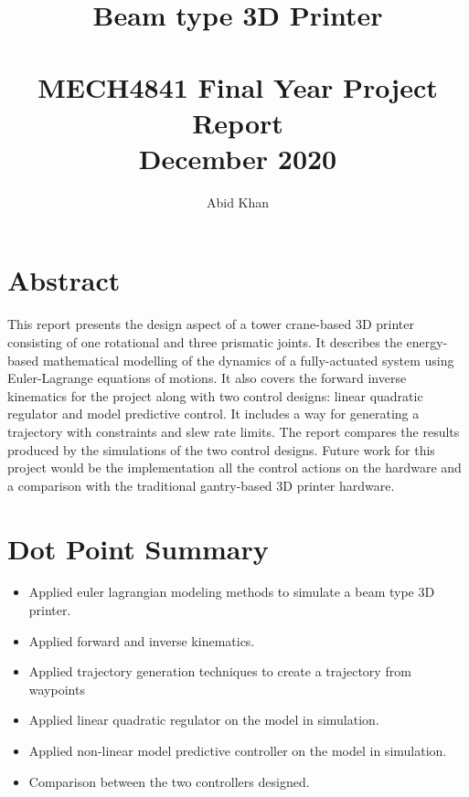 \documentclass{UoNMCHA}
\numberwithin{equation}{section}
\begin{document}
	\title{Beam type 3D Printer \\ \ \\
		{\small MECH4841 Final Year Project Report  \\December 2020}}
	\author[UoNMCHA]{Abid Khan}
	\address[UoNMCHA]{
		Student of Mechatronics Engineering,\\
		The University of Newcastle, Callaghan, NSW 2308, AUSTRALIA \\
		Student Number: 3189548 \\
		E-mail: \href{mailto: c3189548@uon.edu.au}{\textsf{ c3189548@uon.edu.au}}}
	\maketitle
	\onecolumn
	
	\newpage
	\vspace{-5mm}
	\section*{Abstract}
	
	This report presents the design aspect of a tower crane-based 3D printer consisting of one rotational and three prismatic joints. It describes the energy-based mathematical modelling of the dynamics of a fully-actuated system using Euler-Lagrange equations of
	motions. It also covers the forward inverse kinematics for the project along with two control designs: linear quadratic regulator and model predictive control. It includes a way for generating a trajectory with constraints and slew rate limits. The report compares the results produced by the simulations of the two control designs.
	Future work for this project would be the implementation all the control actions on the hardware and a comparison with the traditional gantry-based 3D printer hardware.

	
	\newpage
	\vspace{-5mm}
	\section*{Dot Point Summary}
	
	\begin{itemize}
		\item Applied euler lagrangian modeling methods to simulate a beam type 3D printer.
		\item Applied forward and inverse kinematics.
		\item Applied trajectory generation techniques to create a trajectory from waypoints
		\item Applied linear quadratic regulator on the model in simulation.
		\item Applied non-linear model predictive controller on the model in simulation.
		\item Comparison between the two controllers designed.
		
		
		
	\end{itemize}
	\newpage
	\vspace{-2mm}
\end{document}
